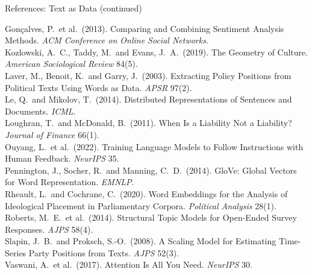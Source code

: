 \documentclass[svgnames,x11names,dvipsnames]{beamer}
\newcommand{\new}[1]{#1}
\begin{document}
\begin{frame}{\new{References: Text as Data (continued)}}
\vspace{0.05cm}
\raggedright
{\scriptsize
Gon\c{c}alves, P.\ et al.\ (2013). Comparing and Combining Sentiment Analysis Methods. \textit{ACM Conference on Online Social Networks}.\\[0.06cm]
Kozlowski, A.\ C., Taddy, M.\ and Evans, J.\ A.\ (2019). The Geometry of Culture. \textit{American Sociological Review} 84(5).\\[0.06cm]
Laver, M., Benoit, K.\ and Garry, J.\ (2003). Extracting Policy Positions from Political Texts Using Words as Data. \textit{APSR} 97(2).\\[0.06cm]
\new{Le, Q.\ and Mikolov, T.\ (2014). Distributed Representations of Sentences and Documents. \textit{ICML}.}\\[0.06cm]
Loughran, T.\ and McDonald, B.\ (2011). When Is a Liability Not a Liability? \textit{Journal of Finance} 66(1).\\[0.06cm]
Ouyang, L.\ et al.\ (2022). Training Language Models to Follow Instructions with Human Feedback. \textit{NeurIPS} 35.\\[0.06cm]
Pennington, J., Socher, R.\ and Manning, C.\ D.\ (2014). GloVe: Global Vectors for Word Representation. \textit{EMNLP}.\\[0.06cm]
Rheault, L.\ and Cochrane, C.\ (2020). Word Embeddings for the Analysis of Ideological Placement in Parliamentary Corpora. \textit{Political Analysis} 28(1).\\[0.06cm]
Roberts, M.\ E.\ et al.\ (2014). Structural Topic Models for Open-Ended Survey Responses. \textit{AJPS} 58(4).\\[0.06cm]
Slapin, J.\ B.\ and Proksch, S.-O.\ (2008). A Scaling Model for Estimating Time-Series Party Positions from Texts. \textit{AJPS} 52(3).\\[0.06cm]
Vaswani, A.\ et al.\ (2017). Attention Is All You Need. \textit{NeurIPS} 30.
}
\end{frame}
\end{document}
